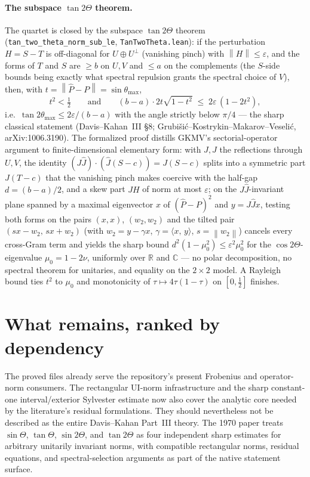 \documentclass[11pt]{article}
\newcommand{\norm}[1]{\left\lVert #1\right\rVert}
\newcommand{\eps}{\varepsilon}
\newcommand{\inner}[2]{\langle #1,\,#2\rangle}
\theoremstyle{remark}
\begin{document}
\paragraph{The subspace $\tan2\Theta$ theorem.}  The quartet is closed by the
subspace $\tan2\Theta$ theorem (\texttt{tan\_two\_theta\_norm\_sub\_le},
\texttt{TanTwoTheta.lean}): if the perturbation $H=S-T$ is off-diagonal for
$U\oplus U^{\perp}$ (vanishing pinch) with $\norm{H}\le\eps$, and the forms of
$T$ and $S$ are $\ge b$ on $U,V$ and $\le a$ on the complements (the $S$-side
bounds being exactly what spectral repulsion grants the spectral choice of
$V$), then, with $t=\norm{\widehat P-P}=\sin\theta_{\max}$,
\[
  t^2<\tfrac12
  \qquad\text{and}\qquad
  (b-a)\cdot 2t\sqrt{1-t^2}\;\le\;2\eps\,(1-2t^2),
\]
i.e.\ $\tan2\theta_{\max}\le2\eps/(b-a)$ with the angle strictly below
$\pi/4$ --- the sharp classical statement (Davis--Kahan~III \S8;
Grubi\v{s}i\'c--Kostrykin--Makarov--Veseli\'c, arXiv:1006.3190).  The
formalized proof distills GKMV's sectorial-operator argument to
finite-dimensional elementary form: with $J,\widehat J$ the reflections
through $U,V$, the identity
$(J\widehat J)\cdot(\widehat J(S-c))=J(S-c)$ splits into a symmetric part
$J(T-c)$ that the vanishing pinch makes coercive with the half-gap
$d=(b-a)/2$, and a skew part $JH$ of norm at most $\eps$; on the
$J\widehat J$-invariant plane spanned by a maximal eigenvector $x$ of
$(\widehat P-P)^2$ and $y=J\widehat Jx$, testing both forms on the pairs
$(x,x)$, $(w_2,w_2)$ and the tilted pair $(sx-w_2,\,sx+w_2)$ (with
$w_2=y-\gamma x$, $\gamma=\inner{x}{y}$, $s=\norm{w_2}$) cancels every
cross-Gram term and yields the sharp bound
$d^2(1-\mu_0^2)\le\eps^2\mu_0^2$ for the $\cos2\Theta$-eigenvalue
$\mu_0=1-2\nu$, uniformly over $\mathbb R$ and $\mathbb C$ --- no polar decomposition, no
spectral theorem for unitaries, and equality on the $2\times2$ model.  A
Rayleigh bound ties $t^2$ to $\mu_0$ and monotonicity of
$\tau\mapsto4\tau(1-\tau)$ on $[0,\tfrac12]$ finishes.

\section{What remains, ranked by dependency}\label{sec:remains}

The proved files already serve the repository's present Frobenius and
operator-norm consumers.  The rectangular UI-norm infrastructure and the sharp
constant-one interval/exterior Sylvester estimate now also cover the analytic
core needed by the literature's residual formulations.  They should
nevertheless not be described as the entire Davis--Kahan Part~III theory.  The
1970 paper treats $\sin\Theta$, $\tan\Theta$, $\sin2\Theta$, and
$\tan2\Theta$ as four independent sharp estimates for arbitrary unitarily
invariant norms, with compatible rectangular norms, residual equations, and
spectral-selection arguments as part of the native statement surface.
\end{document}
